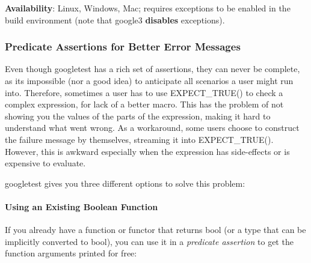 {\bfseries Availability}\+: Linux, Windows, Mac; requires exceptions to be enabled in the build environment (note that {\ttfamily google3} {\bfseries disables} exceptions).

\subsubsection*{Predicate Assertions for Better Error Messages}

Even though googletest has a rich set of assertions, they can never be complete, as it\textquotesingle{}s impossible (nor a good idea) to anticipate all scenarios a user might run into. Therefore, sometimes a user has to use {\ttfamily E\+X\+P\+E\+C\+T\+\_\+\+T\+R\+U\+E()} to check a complex expression, for lack of a better macro. This has the problem of not showing you the values of the parts of the expression, making it hard to understand what went wrong. As a workaround, some users choose to construct the failure message by themselves, streaming it into {\ttfamily E\+X\+P\+E\+C\+T\+\_\+\+T\+R\+U\+E()}. However, this is awkward especially when the expression has side-\/effects or is expensive to evaluate.

googletest gives you three different options to solve this problem\+:

\paragraph*{Using an Existing Boolean Function}

If you already have a function or functor that returns {\ttfamily bool} (or a type that can be implicitly converted to {\ttfamily bool}), you can use it in a {\itshape predicate assertion} to get the function arguments printed for free\+:

